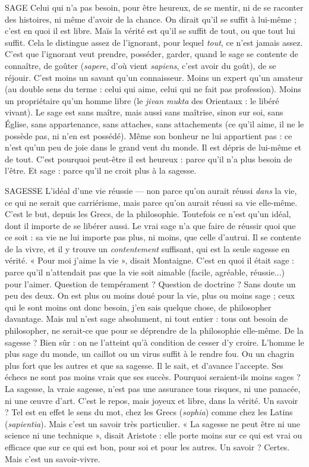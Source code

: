 SAGE Celui qui n’a pas besoin, pour être heureux, de se mentir, ni de se
raconter des histoires, ni même d’avoir de la chance. On dirait qu’il
se suffit à lui-même ; c’est en quoi il est libre. Maïs la vérité est qu’il se suffit de
tout, ou que tout lui suffit. Cela le distingue assez de l’ignorant, pour lequel
{\it tout}, ce n'est jamais assez. C’est que l’ignorant veut prendre, posséder, garder,
quand le sage se contente de connaître, de goûter ({\it sapere}, d’où vient {\it sapiens},
c'est avoir du goût), de se réjouir. C’est moins un savant qu’un connaisseur.
Moins un expert qu’un amateur (au double sens du terme : celui qui aime,
celui qui ne fait pas profession). Moins un propriétaire qu’un homme libre (le
{\it jivan mukta} des Orientaux : le libéré vivant). Le sage est sans maître, mais aussi
sans maîtrise, sinon sur soi, sans Église, sans appartenance, sans attaches, sans
attachements (ce qu’il aime, il ne le possède pas, ni n’en est possédé). Même
son bonheur ne lui appartient pas : ce n’est qu’un peu de joie dans le grand
vent du monde. Il est dépris de lui-même et de tout. C’est pourquoi peut-être
il est heureux : parce qu’il n’a plus besoin de l'être. Et sage : parce qu'il ne croit
plus à la sagesse.

SAGESSE L'idéal d’une vie réussie — non parce qu’on aurait réussi {\it dans} la vie,
ce qui ne serait que carriérisme, mais parce qu’on aurait réussi sa
vie elle-même. C’est le but, depuis les Grecs, de la philosophie. Toutefois ce
n'est qu’un idéal, dont il importe de se libérer aussi. Le vrai sage n’a que faire
de réussir quoi que ce soit : sa vie ne lui importe pas plus, ni moins, que celle
d'autrui. Il se contente de la vivre, et il y trouve un {\it contentement} suffisant, qui
est la seule sagesse en vérité. « Pour moi j'aime la vie », disait Montaigne. C’est
en quoi il était sage : parce qu’il n’attendait pas que la vie soit aimable (facile,
agréable, réussie...) pour l'aimer. Question de tempérament ? Question de
doctrine ? Sans doute un peu des deux. On est plus ou moins doué pour la vie,
plus ou moins sage ; ceux qui le sont moins ont donc besoin, j’en sais quelque
chose, de philosopher davantage. Mais nul n’est sage absolument, ni tout entier :
tous ont besoin de philosopher, ne serait-ce que pour se déprendre de la philosophie
elle-même. De la sagesse ? Bien sûr : on ne l’atteint qu’à condition de
cesser d’y croire. L'homme le plus sage du monde, un caillot ou un virus suffit
à le rendre fou. Ou un chagrin plus fort que les autres et que sa sagesse. Il le
sait, et d'avance l’accepte. Ses échecs ne sont pas moins vrais que ses succès.
Pourquoi seraient-ils moins sages ? La sagesse, la vraie sagesse, n’est pas une
assurance tous risques, ni une panacée, ni une œuvre d’art. C’est le repos, mais
joyeux et libre, dans la vérité. Un savoir ? Tel est en effet le sens du mot, chez
les Grecs ({\it sophia}) comme chez les Latins ({\it sapientia}). Mais c’est un savoir très
particulier. « La sagesse ne peut être ni une science ni une technique », disait
Aristote : elle porte moins sur ce qui est vrai ou efficace que sur ce qui est bon,
pour soi et pour les autres. Un savoir ? Certes. Mais c’est un savoir-vivre.

